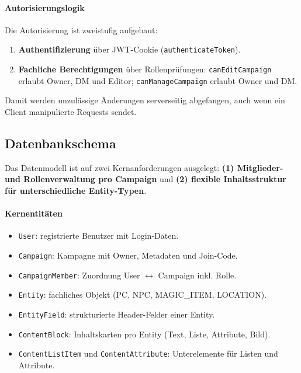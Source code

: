 \paragraph{Autorisierungslogik}
Die Autorisierung ist zweistufig aufgebaut:
\begin{enumerate}
  \item \textbf{Authentifizierung} über JWT-Cookie
  (\texttt{authenticateToken}).
  \item \textbf{Fachliche Berechtigungen} über Rollenprüfungen:
  \texttt{canEditCampaign} erlaubt Owner, DM und Editor;
  \texttt{canManageCampaign} erlaubt Owner und DM.
\end{enumerate}

Damit werden unzulässige Änderungen serverseitig abgefangen, auch wenn ein
Client manipulierte Requests sendet.

\subsection{Datenbankschema}

Das Datenmodell ist auf zwei Kernanforderungen ausgelegt:
\textbf{(1) Mitglieder- und Rollenverwaltung pro Campaign} und
\textbf{(2) flexible Inhaltsstruktur für unterschiedliche Entity-Typen}.

\paragraph{Kernentitäten}
\begin{itemize}
  \item \texttt{User}: registrierte Benutzer mit Login-Daten.
  \item \texttt{Campaign}: Kampagne mit Owner, Metadaten und Join-Code.
  \item \texttt{CampaignMember}: Zuordnung User $\leftrightarrow$ Campaign inkl. Rolle.
  \item \texttt{Entity}: fachliches Objekt (PC, NPC, MAGIC\_ITEM, LOCATION).
  \item \texttt{EntityField}: strukturierte Header-Felder einer Entity.
  \item \texttt{ContentBlock}: Inhaltskarten pro Entity (Text, Liste, Attribute, Bild).
  \item \texttt{ContentListItem} und \texttt{ContentAttribute}: Unterelemente für
  Listen und Attribute.
\end{itemize}

